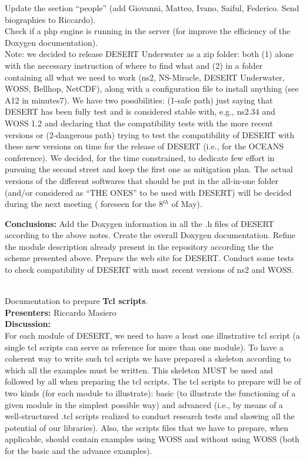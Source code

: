 \documentclass[11pt,journal,draftclsnofoot,onecolumn,twoside,letterpaper]{IEEEtran}
\theoremstyle{definition} \newtheorem{definition}[]{Definition}
\theoremstyle{theorem} \newtheorem{theorem}[]{Theorem}
\begin{document}
Update the section ``people'' (add Giovanni, Matteo, Ivano, Saiful, Federico. Send biographies to Riccardo).\\
Check if a php engine is running in the server (for improve the efficiency of the Doxygen documentation).\\

Note: we decided to release DESERT Underwater as a zip folder: both (1) alone with the necessary instruction of where to find what and (2) in a folder containing all what we need to work (ns2, NS-Miracle, DESERT Underwater, WOSS, Bellhop, NetCDF), along with a configuration file to install anything (see A12 in minutes7). We have two possibilities: (1-safe path) just saying that DESERT has been fully test and is considered stable with, e.g., ns2.34 and WOSS 1.2 and declaring that the compatibility tests with the more recent versions or (2-dangerous path) trying to test the compatibility of DESERT with these new versions on time for the release of DESERT (i.e., for the OCEANS conference). We decided, for the time constrained, to dedicate few effort in pursuing the second street and keep the first one as mitigation plan. The actual versions of the different softwares that should be put in the all-in-one folder (and/or considered as ``THE ONES'' to be used with DESERT) will be decided during the next meeting (
foreseen for the 8$^{th}$ of May).

{\bf Conclusions:} Add the Doxygen information in all the .h files of DESERT according to the above notes. Create the overall Doxygen documentation. Refine the module description already present in the repository according the the scheme presented above. Prepare the web site for DESERT. Conduct some tests to check compatibility of DESERT with most recent versions of ns2 and WOSS.

\  \\
 Documentation to prepare {\bf Tcl scripts}.\\
{\bf Presenters:} Riccardo Masiero\\
{\bf Discussion:}\\

For each module of DESERT, we need to have a least one illustrative tcl script (a single tcl scripts can serve as reference for more than one module). To have a coherent way to write such tcl scripts we have prepared a skeleton according to which all the examples must be written. This skeleton MUST be used and followed by all when preparing the tcl scripts. The tcl scripts to prepare will be of two kinds (for each module to illustrate): basic (to illustrate the functioning of a given module in the simplest possible way) and advanced (i.e., by means of a well-structured .tcl scripts realized to conduct research tests and showing all the potential of our libraries). Also, the scripts files that we have to prepare, when applicable, should contain examples using WOSS and without using WOSS (both for the basic and the advance examples).
\end{document}
